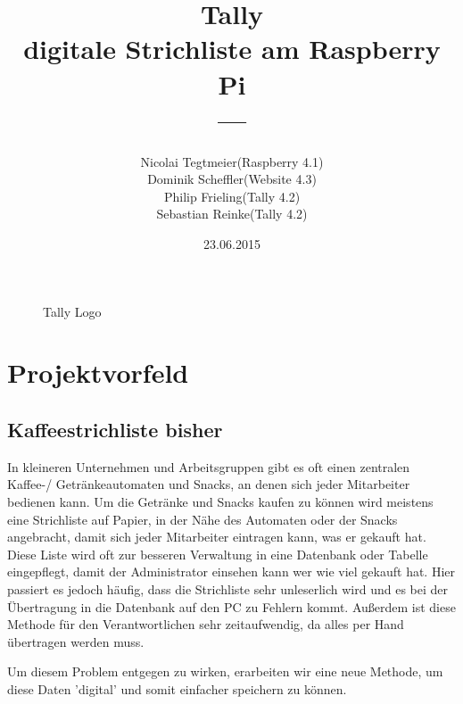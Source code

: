 \documentclass[11pt,a4paper]{article} %
\title{\normalfont\bfseries{Tally\\ digitale Strichliste am Raspberry Pi}\\---}
\author{Nicolai Tegtmeier(Raspberry 4.1) \\ Dominik Scheffler(Website 4.3) \\ Philip Frieling(Tally 4.2) \\ Sebastian Reinke(Tally 4.2)}
\date{23.06.2015}
\begin{document}



\begin{titlepage}
	\maketitle
	\begin{figure}[h]
	\caption{Tally Logo}
	\end{figure}
\end{titlepage}

\tableofcontents
\newpage

\section{Projektvorfeld}
\label{Grundlagen}


\subsection{Kaffeestrichliste bisher}

In kleineren Unternehmen und Arbeitsgruppen gibt es oft einen zentralen Kaffee-/ Getränkeautomaten und Snacks, an denen sich jeder Mitarbeiter bedienen kann. Um die Getränke und Snacks kaufen zu können wird meistens eine Strichliste auf Papier, in der Nähe des Automaten oder der Snacks angebracht, damit sich jeder Mitarbeiter eintragen kann, was er gekauft hat. Diese Liste wird oft zur besseren Verwaltung in eine Datenbank oder Tabelle eingepflegt, damit der Administrator einsehen kann wer wie viel gekauft hat. Hier passiert es jedoch häufig, dass die Strichliste sehr unleserlich wird und es bei der Übertragung in die Datenbank auf den PC zu Fehlern kommt. Außerdem ist diese Methode für den Verantwortlichen sehr zeitaufwendig, da alles per Hand übertragen werden muss.
\par
Um diesem Problem entgegen zu wirken, erarbeiten wir eine neue Methode, um diese Daten 'digital' und somit einfacher speichern zu können.
\end{document}

